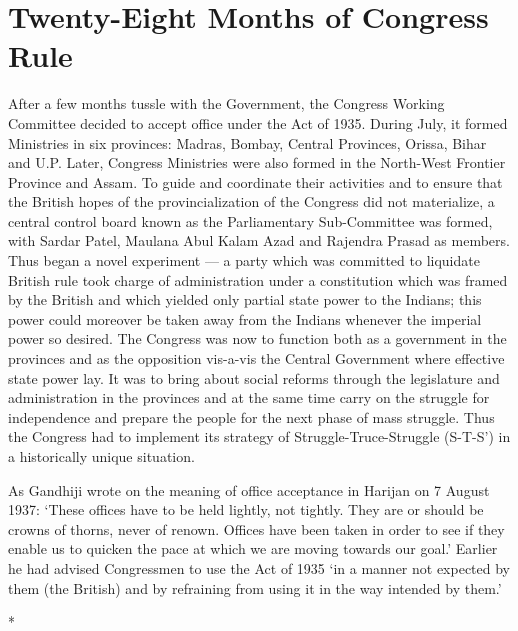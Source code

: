 \chapter{Twenty-Eight Months of Congress Rule}
\begin{multicols}{2}
After a few months tussle with the Government, the Congress Working Committee decided to accept office under the Act of 1935. During July, it formed Ministries in six provinces: Madras, Bombay, Central Provinces, Orissa, Bihar and U.P. Later, Congress Ministries were also formed in the North-West Frontier Province and Assam. To guide and coordinate their activities and to ensure that the British hopes of the provincialization of the Congress did not materialize, a central control board known as the Parliamentary Sub-Committee was formed, with Sardar Patel, Maulana Abul Kalam Azad and Rajendra Prasad as members. Thus began a novel experiment --- a party which was committed to liquidate British rule took charge of administration under a constitution which was framed by the British and which yielded only partial state power to the Indians; this power could moreover be taken away from the Indians whenever the imperial power so desired. The Congress was now to function both as a government in the provinces and as the opposition vis-a-vis the Central Government where effective state power lay. It was to bring about social reforms through the legislature and administration in the provinces and at the same time carry on the struggle for independence and prepare the people for the next phase of mass struggle. Thus the Congress had to implement its strategy of Struggle-Truce-Struggle (S-T-S') in a historically unique situation.

As Gandhiji wrote on the meaning of office acceptance in Harijan on 7 August 1937: `These offices have to be held lightly, not tightly. They are or should be crowns of thorns, never of renown. Offices have been taken in order to see if they enable us to quicken the pace at which we are moving towards our goal.' Earlier he had advised Congressmen to use the Act of 1935 `in a manner not expected by them (the British) and by refraining from using it in the way intended by them.'

\begin{center}*\end{center}


\end{multicols}
